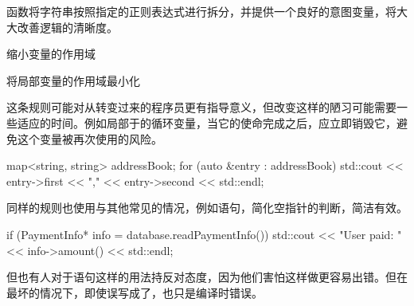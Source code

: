 \begin{content}
函数将字符串按照指定的正则表达式进行拆分，并提供一个良好的意图变量，将大大改善逻辑的清晰度。

\begin{regulation}
缩小变量的作用域
\end{regulation}

\begin{regulation}
将局部变量的作用域最小化
\end{regulation}

这条规则可能对从\clang{}转变过来的\cpp{}程序员更有指导意义，但改变这样的陋习可能需要一些适应的时间。例如局部于的循环变量，当它的使命完成之后，应立即销毁它，避免这个变量被再次使用的风险。

\begin{leftbar}
\begin{c++}
map<string, string> addressBook;
for (auto &entry : addressBook) 
{ 
    std::cout << entry->first << "," << entry->second << std::endl;
}
\end{c++}
\end{leftbar}

同样的规则也使用与其他常见的情况，例如语句，简化空指针的判断，简洁有效。

\begin{leftbar}
\begin{c++}
if (PaymentInfo* info = database.readPaymentInfo()) 
{
    std::cout << "User paid: " << info->amount() << std::endl;
}
\end{c++}
\end{leftbar}

但也有人对于语句这样的用法持反对态度，因为他们害怕这样做更容易出错。但在最坏的情况下，即使误写成了\ascii{==}，也只是编译时错误。

\end{content}
